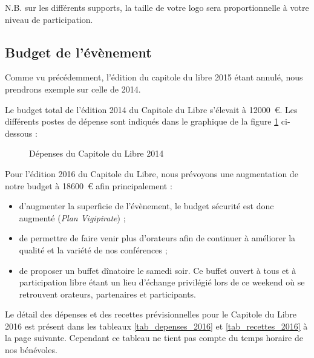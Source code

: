 N.B. sur les différents supports, la taille de votre logo sera proportionnelle à votre niveau de participation.

\newpage

\subsection{Budget de l’évènement}
	
Comme vu précédemment, l'édition du capitole du libre 2015 étant annulé, nous prendrons exemple sur celle de 2014.

Le budget total de l'édition 2014 du Capitole du Libre s'élevait à
 \SI{12000}{\euro}. Les différents postes de dépense sont indiqués dans
 le graphique de la figure \ref{fig_budget} ci-dessous : 

\begin{figure}[h]
\begin{center}
\end{center}
\caption{Dépenses du Capitole du Libre 2014}\label{fig_budget}
\end{figure}


Pour l'édition 2016 du Capitole du Libre, nous prévoyons une augmentation de notre budget à \SI{18600}{\euro} afin principalement :
\begin{itemize}[label=$\bullet$]
\item d'augmenter la superficie de l'évènement, le budget sécurité est donc augmenté (\emph{Plan Vigipirate}) ;
\item de permettre de faire venir plus d'orateurs afin de continuer à améliorer la qualité et la variété de nos conférences ;
\item de proposer un buffet dînatoire le samedi soir. Ce buffet ouvert à tous et à participation libre étant un lieu d'échange privilégié lors de ce weekend où se retrouvent orateurs, partenaires et participants.
\end{itemize}

\Separateur

Le détail des dépenses et des recettes prévisionnelles pour le Capitole du Libre 2016 est présent dans les tableaux \ref{tab_depenses_2016} et \ref{tab_recettes_2016} à la page suivante. Cependant ce tableau ne tient pas compte du temps horaire de nos bénévoles.

